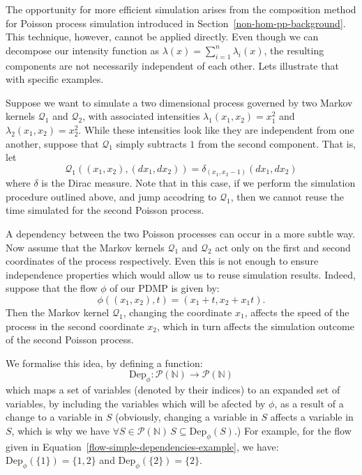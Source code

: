 \documentclass[report.tex]{subfiles}
\begin{document}
The opportunity for more efficient simulation arises
from the composition method for Poisson process simulation introduced in
Section~\ref{non-hom-pp-background}.
This technique, however, cannot be applied directly. Even though we can decompose
our intensity function as $\lambda(x) = \sum_{i=1}^{n} \lambda_{i}(x)$, the
resulting components are not necessarily independent of each other. Lets illustrate
that with specific examples.

Suppose we want to simulate a two dimensional process governed by two
Markov kernels $\mathcal{Q}_{1}$ and $\mathcal{Q}_{2}$, with associated
intensities \mbox{$\lambda_{1}(x_{1}, x_{2}) = x_{1}^{2}$}
and \mbox{$\lambda_{2}(x_{1}, x_{2}) = x_{2}^{2}$}.
While these intensities look like they are independent from one another,
suppose that $\mathcal{Q}_{1}$ simply subtracts $1$ from the second component.
That is, let
$$
\mathcal{Q}_{1}((x_{1}, x_{2}), (dx_{1}, dx_{2})) = \delta_{(x_{1}, x_{2}-1)}(dx_{1}, dx_{2})
$$
where $\delta$ is the Dirac measure.
Note that in this case, if we perform the simulation procedure outlined above,
and jump accodring to $\mathcal{Q}_{1}$, then we cannot reuse the time simulated
for the second Poisson process.

A dependency between the two Poisson processes can occur in a more subtle way.
Now assume that the Markov kernels $\mathcal{Q}_{1}$ and $\mathcal{Q}_{2}$ act
only on the first and second coordinates of the process respectively. Even this
is not enough to ensure independence properties which would allow us to reuse simulation
results.
Indeed, suppose that the flow $\phi$ of our PDMP is given by:
\begin{equation}
\label{flow-simple-dependencies-example}
\phi((x_{1}, x_{2}), t) = (x_{1} + t, x_{2} + x_{1}t).
\end{equation}
Then the Markov kernel $\mathcal{Q}_{1}$, changing the coordinate $x_{1}$,
affects the speed of the process in the second coordinate $x_{2}$, which
in turn affects the simulation outcome of the second Poisson process.

We formalise this idea, by defining a function:
\begin{equation}
  \text{Dep}_{\phi} : \mathcal{P}(\mathbb{N}) \to \mathcal{P}(\mathbb{N})
\end{equation}
which maps a set of variables (denoted by their indices) to an expanded
set of variables, by including the variables which will be afected by $\phi$,
as a result of a change to a variable in $S$ (obviously, changing a variable in $S$ affects a variable in $S$,
which is why we have $\forall S \in \mathcal{P}(\mathbb{N})\,S \subseteq \text{Dep}_{\phi}(S)$.)
For example, for the flow given in Equation~\ref{flow-simple-dependencies-example}, we have:
\mbox{$\text{Dep}_{\phi}(\{1\}) = \{1, 2\}$} and \mbox{$\text{Dep}_{\phi}(\{2\}) = \{2\}$}.
\end{document}
